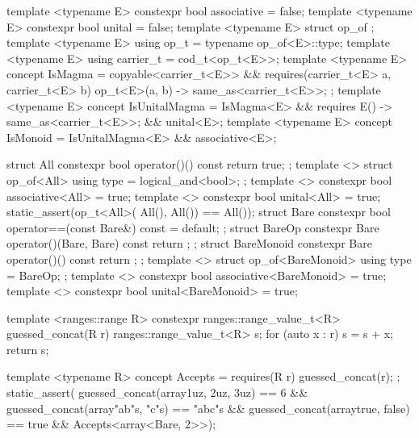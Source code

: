 \begin{listing}[tp]
\begin{minipage}[t]{0.48\linewidth}
\begin{cpp}
template <typename E>
constexpr bool associative = false;
template <typename E>
constexpr bool unital = false;
template <typename E> struct op_of {};
template <typename E>
using op_t = typename op_of<E>::type;
template <typename E>
using carrier_t = cod_t<op_t<E>>;
template <typename E>
concept IsMagma =
  copyable<carrier_t<E>> &&
  requires(carrier_t<E> a, carrier_t<E> b) {
    { op_t<E>{}(a, b) }
      -> same_as<carrier_t<E>>; };
template <typename E>
concept IsUnitalMagma = IsMagma<E> &&
  requires { { E{}() }
    -> same_as<carrier_t<E>>; } &&
  unital<E>;
template <typename E>
concept IsMonoid =
  IsUnitalMagma<E> && associative<E>;
\end{cpp}
\end{minipage}\hspace{0.04\linewidth}%
\begin{minipage}[t]{0.48\linewidth}
\begin{cpp}
struct All { constexpr bool
  operator()() const { return true; } };
template <> struct op_of<All> {
  using type = logical_and<bool>; };
template <> constexpr bool
associative<All> = true;
template <> constexpr bool
unital<All> = true;
static_assert(op_t<All>{}(
    All{}(), All{}()) == All{}());
struct Bare { constexpr bool
  operator==(const Bare&) const = default; };
struct BareOp { constexpr Bare
  operator()(Bare, Bare) const { return {}; } };
struct BareMonoid { constexpr Bare
  operator()() const { return {}; } };
template <> struct op_of<BareMonoid> {
  using type = BareOp; };
template <> constexpr bool
associative<BareMonoid> = true;
template <> constexpr bool
unital<BareMonoid> = true;
\end{cpp}
\end{minipage}

\vspace{-7pt}
\begin{minipage}[t]{0.48\linewidth}
\begin{cpp}
template <ranges::range R>
constexpr ranges::range_value_t<R>
guessed_concat(R r) {
  ranges::range_value_t<R> s{};
  for (auto x : r) s = s + x;
  return s; }
\end{cpp}
\end{minipage}\hspace{0.04\linewidth}%
\begin{minipage}[t]{0.48\linewidth}
\begin{cpp}
template <typename R>
concept Accepts =
    requires(R r) { guessed_concat(r); };
static_assert(
guessed_concat(array{1uz, 2uz, 3uz}) == 6 &&
guessed_concat(array{"ab"s, "c"s}) == "abc"s &&
guessed_concat(array{true, false}) == true &&
Accepts<array<Bare, 2>>);
\end{cpp}
\end{minipage}


\end{listing}
